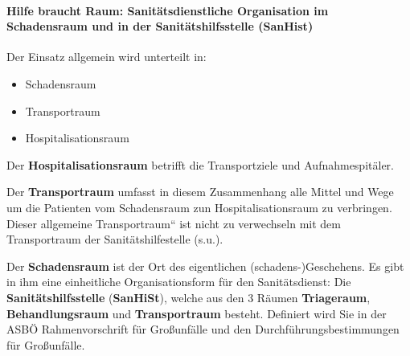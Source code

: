 \documentclass{article}
\newcommand\gEs[1]{\textbf{\textcolor[rgb]{0.0,0.0,0.5019608}{#1}}}
\newcommand\gEs[1]{\textbf{\textcolor[rgb]{0.0,0.0,0.5019608}{#1}}}
\newcommand\gT[1]{\textbf{\textup{\textcolor[rgb]{0.0,0.5019608,0.0}{#1}}}}
\begin{document}
\paragraph{Hilfe braucht Raum: Sanit\"atsdienstliche Organisation im
Schadensraum und in der Sanit\"atshilfsstelle (SanHist)}
{\mdseries
Der Einsatz allgemein wird unterteilt in: }

\begin{itemize}
\item Schadensraum

\item Transportraum

\item Hospitalisationsraum

\end{itemize}
{\mdseries
Der \gEs{Hospitalisationsraum} betrifft die
Transportziele und Aufnahmespit\"aler. }

{\mdseries
Der \gEs{Transportraum} umfasst in diesem
Zusammenhang alle Mittel und Wege um die Patienten vom Schadens\-raum
zun Hospitalisationsraum zu verbringen. Dieser
{\quotedblbase}allgemeine Transportraum{\textquotedblleft} ist nicht zu
ver\-wechseln mit dem Transportraum der Sanit\"atshilfestelle (s.u.). 
}

{\mdseries
Der \gEs{Schadensraum} ist der Ort des eigentlichen
(schadens-)Geschehens. Es gibt in ihm eine einheitliche
Organisations\-form f\"ur den Sanit\"atsdienst: Die
\gT{Sanit\"atshilfsstelle}
(\gT{SanHiSt}), welche aus den 3 R\"aumen
\gT{Triageraum}, \gT{Behandlungsraum} und
\gT{Transportraum} besteht. Definiert wird Sie in der
ASB\"O Rahmen\-vor\-schrift f\"ur Gro{\ss}unf\"alle und den
Durchf\"uhrungsbestimmungen f\"ur Gro{\ss}unf\"alle. }
\end{document}
